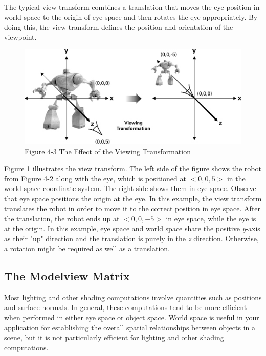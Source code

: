 \documentclass{book}
\begin{document}
The typical view transform combines a translation that moves the eye position in world space to the origin of eye space and then rotates the eye appropriately. By doing this, the view transform defines the position and orientation of the viewpoint.

\begin{figure}
    \centering
    \includegraphics[width=1\linewidth]{Images/fig4_3.jpg}
    \caption{Figure 4-3 The Effect of the Viewing Transformation}
    \label{fig:4-3}
\end{figure}

Figure \ref{fig:4-3} illustrates the view transform. The left side of the figure shows the robot from Figure 4-2 along with the eye, which is positioned at $<0, 0, 5>$ in the world-space coordinate system. The right side shows them in eye space. Observe that eye space positions the origin at the eye. In this example, the view transform translates the robot in order to move it to the correct position in eye space. After the translation, the robot ends up at $<0, 0, -5>$ in eye space, while the eye is at the origin. In this example, eye space and world space share the positive \textit{y}-axis as their "up" direction and the translation is purely in the \textit{z} direction. Otherwise, a rotation might be required as well as a translation.

\subsection*{The Modelview Matrix}

Most lighting and other shading computations involve quantities such as positions and surface normals. In general, these computations tend to be more efficient when performed in either eye space or object space. World space is useful in your application for establishing the overall spatial relationships between objects in a scene, but it is not particularly efficient for lighting and other shading computations.
\end{document}
